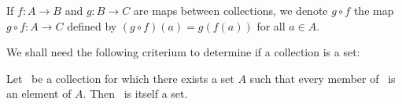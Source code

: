 \begin{notation}\label{Cat:ax:composition}
    If $f:A\to B$ and $g:B\to C$ are maps between collections,
    we denote $g\circ f$ the map $g\circ f:A\to C$ defined by 
    $(g\circ f)(a) = g(f(a))$ for all $a\in A$.
\end{notation}

We shall need the following criterium to determine if a
collection is a set:

\begin{axiom}\label{Cat:ax:collection:set}
    Let \Cat\ be a collection for which there exists a set $A$ such
    that every member of \Cat\ is an element of $A$. Then \Cat\ is
    itself a set.
\end{axiom}
